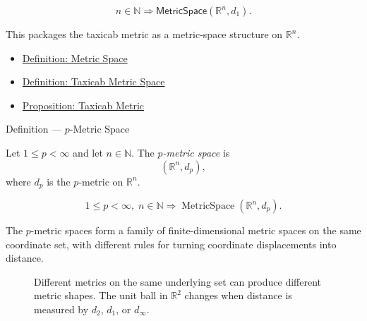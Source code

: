 \begin{remark*}
\[
  n\in\mathbb{N}\Longrightarrow\mathsf{MetricSpace}(\mathbb{R}^n,d_1).
\]
\end{remark*}

\begin{remark*}[Interpretation]
This packages the taxicab metric as a metric-space structure on \(\mathbb{R}^n\).
\end{remark*}

\begin{dependencies}
\begin{itemize}
  \item \hyperref[def:metric-space]{Definition: Metric Space}
  \item \hyperref[def:taxicab-metric-space]{Definition: Taxicab Metric Space}
  \item \hyperref[prop:taxicab-metric-rn]{Proposition: Taxicab Metric}
\end{itemize}
\end{dependencies}

\begin{definitionbox}{Definition --- \(p\)-Metric Space}
\begin{definition}\label{def:lp-metric-space}
Let \(1\leq p<\infty\) and let \(n\in\mathbb{N}\).  The \emph{\(p\)-metric
space} is
\[
  (\mathbb{R}^n,d_p),
\]
where \(d_p\) is the \(p\)-metric on \(\mathbb{R}^n\).
\end{definition}
\end{definitionbox}

\begin{remark*}
\[
1\leq p<\infty,\; n\in\mathbb{N}
\Longrightarrow
\operatorname{MetricSpace}(\mathbb{R}^n,d_p).
\]
\end{remark*}

\begin{remark*}[Interpretation]
The \(p\)-metric spaces form a family of finite-dimensional metric spaces on
the same coordinate set, with different rules for turning coordinate
displacements into distance.
\end{remark*}

\begin{figure}[htbp]
\centering

\caption{Different metrics on the same underlying set can produce different
metric shapes.  The unit ball in \(\mathbb{R}^2\) changes when distance is
measured by \(d_2\), \(d_1\), or \(d_\infty\).}
\label{fig:metric-unit-balls-r2}
\end{figure}

